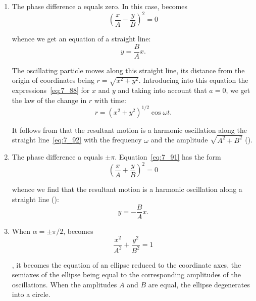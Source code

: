 \begin{enumerate}[1.]
	\item The phase difference a equals zero. In this case,  becomes
	\begin{equation*}
		\left(\frac{x}{A} - \frac{y}{B}\right)^{2} = 0
	\end{equation*}

	\noindent
	whence we get an equation of a straight line:
	\begin{equation}\label{eq:7_92}
		y = \frac{B}{A}x.
	\end{equation}

	\noindent
	The oscillating particle moves along this straight line, its distance from the origin of coordinates being $r=\sqrt{x^2+y^2}$. Introducing into this equation the expressions~\eqref{eq:7_88} for $x$ and $y$ and taking into account that $a=0$, we get the law of the change in $r$ with time:
	\begin{equation}\label{eq:7_93}
		r = \left(x^2 + y^2\right)^{1/2}\cos\omega t.
	\end{equation}

	\noindent
	It follows from  that the resultant motion is a harmonic oscillation along the straight line~\eqref{eq:7_92} with the frequency $\omega$ and the amplitude $\sqrt{A^2+B^2}$ ().

	\item The phase difference a equals $\pm\pi$. Equation~\eqref{eq:7_91} has the form
	\begin{equation*}
		\left(\frac{x}{A} + \frac{y}{B}\right)^{2} = 0
	\end{equation*}

	\noindent
	whence we find that the resultant motion is a harmonic oscillation along a straight line ():
	\begin{equation*}
		y = -\frac{B}{A}x.
	\end{equation*}

	\item When $\alpha=\pm\pi/2$,  becomes
	\begin{equation}\label{eq:7_94}
		\frac{x^2}{A^2} + \frac{y^2}{B^2} = 1
	\end{equation}

	\noindent
	\ie, it becomes the equation of an ellipse reduced to the coordinate axes, the semiaxes of the ellipse being equal to the corresponding amplitudes of the oscillations. When the amplitudes $A$ and $B$ are equal, the ellipse degenerates into a circle.


\end{enumerate}
